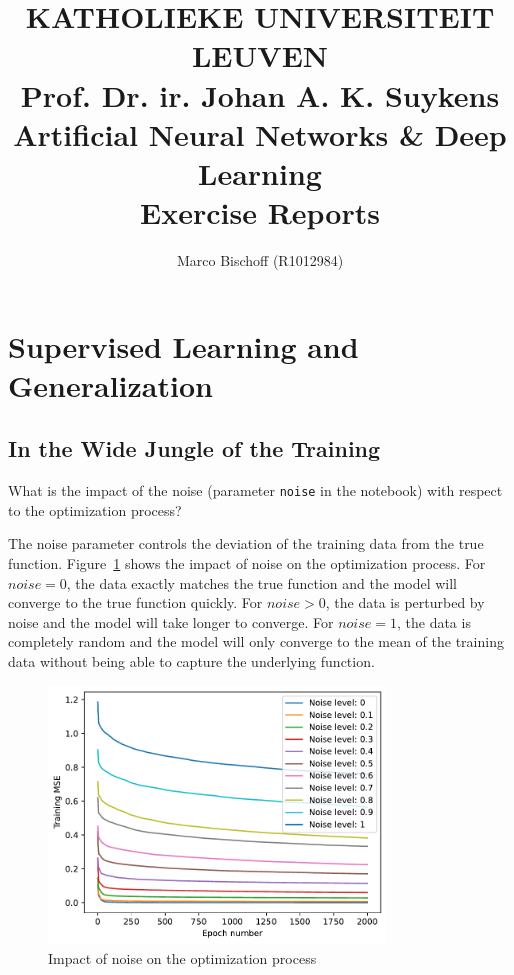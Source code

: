 \documentclass{article}
\title{
  \vspace*{2cm}
  {\bf \scriptsize
    KATHOLIEKE UNIVERSITEIT LEUVEN \\\vspace{0.3cm}
    Prof. Dr. ir. Johan A. K. Suykens
  } \vspace{2cm} \\
  Artificial Neural Networks \& Deep Learning \\
  {\large Exercise Reports}
}
\author{Marco Bischoff (R1012984)}
\newenvironment{task}[1]{
  \begin{tcolorbox}[
    colback=highlight!5!white,
    colframe=highlight,
    title={Task #1}
  ]
}{
  \end{tcolorbox}
}
\begin{document}
\pagestyle{headings}

\maketitle
\newpage

\tableofcontents
\newpage



\section{Supervised Learning and Generalization}
\label{ex:1}

\setcounter{subsection}{2}
\subsection{In the Wide Jungle of the Training}
\label{task:1.3}


\begin{task}{1.3.1}
  What is the impact of the noise (parameter \texttt{noise} in the notebook) with respect to the
  optimization process?
\end{task}

The noise parameter controls the deviation of the training data from the true function.
Figure~\ref{fig:ex1_noise-level} shows the impact of noise on the optimization process. For $noise =
  0$, the data exactly matches the true function and the model will converge to the true function
quickly. For $noise > 0$, the data is perturbed by noise and the model will take longer to converge.
For $noise = 1$, the data is completely random and the model will only converge to the mean of the
training data without being able to capture the underlying function.
\begin{figure}[ht!]
  \centering
  \includegraphics[width=0.8\textwidth]{ex1_noise-level.pdf}
  \caption{Impact of noise on the optimization process}
  \label{fig:ex1_noise-level}
\end{figure}
\end{document}

